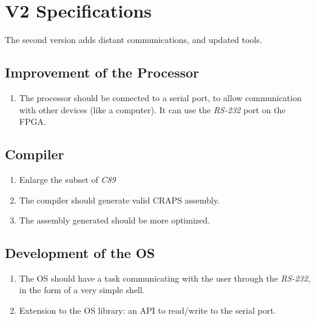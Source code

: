 \documentclass{article}
\begin{document}
    \section{V2 Specifications}
      The second version adds distant communications, and updated tools.

      \subsection{Improvement of the Processor}
        \begin{enumerate}
          \item The processor should be connected to a serial port, to allow
            communication with other devices (like a computer). It can use the
            \textit{RS-232} port on the FPGA.
        \end{enumerate}

      \subsection{Compiler}
        \begin{enumerate}
          \item Enlarge the subset of \textit{C89}
          \item The compiler should generate valid CRAPS assembly.
          \item The assembly generated should be more optimized.
        \end{enumerate}

      \subsection{Development of the OS}
        \begin{enumerate}
          \item The OS should have a task communicating with the user through
            the \textit{RS-232}, in the form of a very simple shell.
          \item Extension to the OS library: an API to read/write to the serial
            port.
        \end{enumerate}
\end{document}
